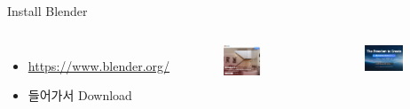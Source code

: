 \documentclass[12pt]{beamer}
\begin{document}
\begin{frame}{Install Blender}
    \begin{columns}
            \begin{itemize}
                \item \small{\url{https://www.blender.org/}} \newline
                \item 들어가서 Download 
            \end{itemize}

            \begin{figure}[t]
            \centering
            \includegraphics[width=0.7\textwidth]{image/install1.jpg}
            \end{figure}

            \begin{figure}[t]
                \centering
                \includegraphics[width=0.7\textwidth]{image/install2.jpg}
            \end{figure}
    \end{columns}
\end{frame}
\end{document}
